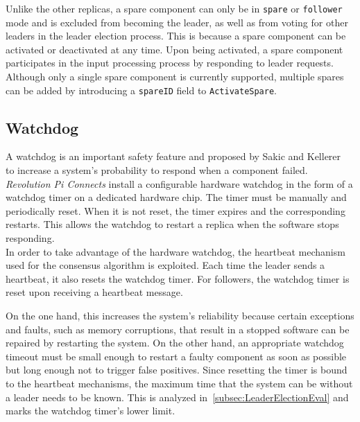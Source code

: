 \noindent
Unlike the other replicas, a spare component can only be in \texttt{spare} or \texttt{follower} mode and is excluded from becoming the leader, as well as from voting for other leaders in the leader election process.
This is because a spare component can be activated or deactivated at any time.
Upon being activated, a spare component participates in the input processing process by responding to leader requests. Although only a single spare component is currently supported, multiple spares can be added by introducing a \texttt{spareID} field to \texttt{ActivateSpare}.

\subsection{Watchdog}

A watchdog is an important safety feature and proposed by Sakic and Kellerer~\cite{SakicTimeInConsensus} to increase a system's probability to respond when a component failed.
\textit{Revolution Pi Connects} install a configurable hardware watchdog in the form of a watchdog timer on a dedicated hardware chip.
The timer must be manually and periodically reset.
When it is not reset, the timer expires and the corresponding  restarts.
This allows the watchdog to restart a replica when the  software stops responding.
\\

\noindent
In order to take advantage of the hardware watchdog, the heartbeat mechanism used for the consensus algorithm is exploited.
Each time the leader sends a heartbeat, it also resets the watchdog timer.
For followers, the watchdog timer is reset upon receiving a heartbeat message.

On the one hand, this increases the system's reliability because certain exceptions and faults, such as memory corruptions, that result in a stopped software can be repaired by restarting the system.
On the other hand, an appropriate watchdog timeout must be small enough to restart a faulty component as soon as possible but long enough not to trigger false positives.
Since resetting the timer is bound to the heartbeat mechanisms, the maximum time that the system can be without a leader needs to be known.
This is analyzed in~\autoref{subsec:LeaderElectionEval} and marks the watchdog timer's lower limit.


\iffalse






